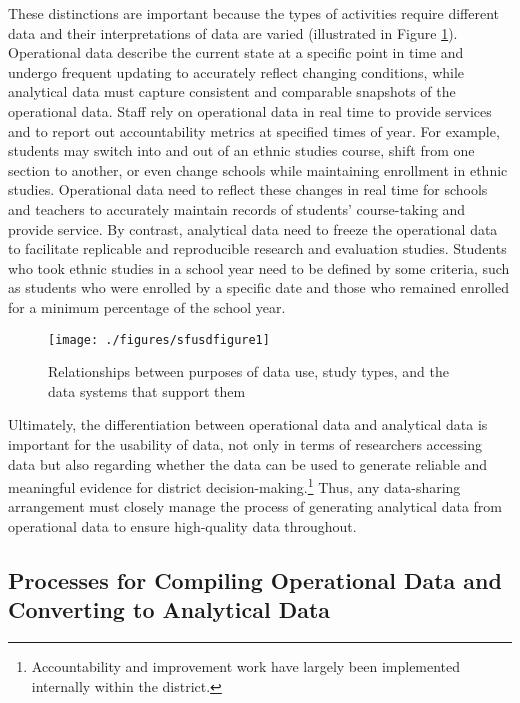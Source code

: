 These distinctions are important because the types of activities require different data and their interpretations of data are varied (illustrated in Figure \ref{fig:sfusdfigure1}). Operational data describe the current state at a specific point in time and undergo frequent updating to accurately reflect changing conditions, while analytical data must capture consistent and comparable snapshots of the operational data. Staff rely on operational data in real time to provide services and to report out accountability metrics at specified times of year. For example, students may switch into and out of an ethnic studies course, shift from one section to another, or even change schools while maintaining enrollment in ethnic studies. Operational data need to reflect these changes in real time for schools and teachers to accurately maintain records of students' course-taking and provide service. By contrast, analytical data need to freeze the operational data to facilitate replicable and reproducible research and evaluation studies. Students who took ethnic studies in a school year need to be defined by some criteria, such as students who were enrolled by a specific date and those who remained enrolled for a minimum percentage of the school year.

\begin{figure}
\texttt{[image: ./figures/sfusdfigure1]} \caption{Relationships between purposes of data use, study types, and the data systems that support them}\label{fig:sfusdfigure1}
\end{figure}

Ultimately, the differentiation between operational data and analytical data is important for the usability of data, not only in terms of researchers accessing data but also regarding whether the data can be used to generate reliable and meaningful evidence for district decision-making.\footnote{Accountability and improvement work have largely been implemented internally within the district.} Thus, any data-sharing arrangement must closely manage the process of generating analytical data from operational data to ensure high-quality data throughout.

\hypertarget{processes-for-compiling-operational-data-and-converting-to-analytical-data}{%
\subsection{Processes for Compiling Operational Data and Converting to Analytical Data}\label{processes-for-compiling-operational-data-and-converting-to-analytical-data}}

